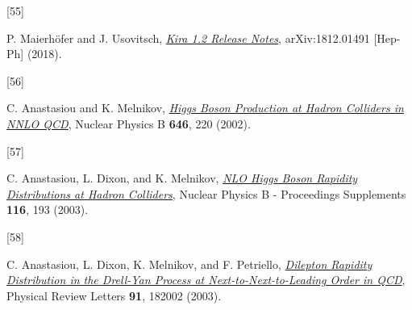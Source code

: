 \documentclass[
  10pt,
  a4paper,
  DIV=11,
  numbers=noendperiod,
  oneside]{scrreprt}
\newlength{\cslhangindent}
\newlength{\csllabelwidth}
\newlength{\cslentryspacingunit} %
\newenvironment{CSLReferences}[2] %
 {%
  \setlength{\parindent}{0pt}
  \ifodd #1
  \let\oldpar\par
  \def\par{\hangindent=\cslhangindent\oldpar}
  \fi
  \setlength{\parskip}{#2\cslentryspacingunit}
 }%
 {}
\newcommand{\CSLLeftMargin}[1]{\parbox[t]{\csllabelwidth}{#1}}
\newcommand{\CSLRightInline}[1]{\parbox[t]{\linewidth - \csllabelwidth}{#1}\break}
\DeclareRobustCommand{\[}{\begin{equation}}
\DeclareRobustCommand{\]}{\end{equation}}
\begin{document}
\begin{CSLReferences}{0}{0}
\leavevmode{}%
\CSLLeftMargin{{[}55{]} }%
\CSLRightInline{P. Maierhöfer and J. Usovitsch,
\emph{\href{https://arxiv.org/abs/1812.01491}{Kira 1.2 {Release
Notes}}}, arXiv:1812.01491 {[}Hep-Ph{]} (2018).}

\leavevmode{}%
\CSLLeftMargin{{[}56{]} }%
\CSLRightInline{C. Anastasiou and K. Melnikov,
\emph{\href{https://doi.org/10.1016/S0550-3213(02)00837-4}{Higgs Boson
Production at Hadron Colliders in {NNLO QCD}}}, Nuclear Physics B
\textbf{646}, 220 (2002).}

\leavevmode{}%
\CSLLeftMargin{{[}57{]} }%
\CSLRightInline{C. Anastasiou, L. Dixon, and K. Melnikov,
\emph{\href{https://doi.org/10.1016/S0920-5632(03)80168-8}{{NLO Higgs}
Boson Rapidity Distributions at Hadron Colliders}}, Nuclear Physics B -
Proceedings Supplements \textbf{116}, 193 (2003).}

\leavevmode{}%
\CSLLeftMargin{{[}58{]} }%
\CSLRightInline{C. Anastasiou, L. Dixon, K. Melnikov, and F. Petriello,
\emph{\href{https://doi.org/10.1103/PhysRevLett.91.182002}{Dilepton
{Rapidity Distribution} in the {Drell-Yan Process} at
{Next-to-Next-to-Leading Order} in {QCD}}}, Physical Review Letters
\textbf{91}, 182002 (2003).}

\end{CSLReferences}
\end{document}
